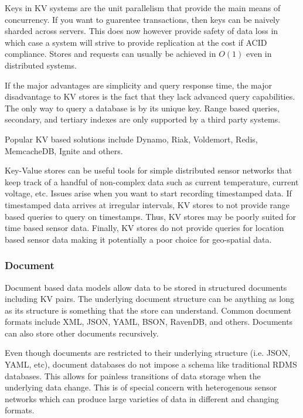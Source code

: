 \documentclass[twocolumn]{article}
\begin{document}
Keys in KV systems are the unit parallelism that provide the main means of concurrency. If you want to guarentee transactions, then keys can be naively sharded across servers. This does now however provide safety of data loss in which case a system will strive to provide replication at the cost if ACID compliance. Stores and requests can usually be achieved in $O(1)$ even in distributed systems\cite{ravendb}.

If the major advantages are simplicity and query response time\cite{chen_big_2014}, the major disadvantage to KV stores is the fact that they lack advanced query capabilities. The only way to query a database is by its unique key. Range based queries, secondary, and tertiary indexes are only supported by a third party systems.

Popular KV based solutions include Dynamo, Riak, Voldemort, Redis, MemcacheDB, Ignite  and others.

Key-Value stores can be useful tools for simple distributed sensor networks that keep track of a handful of non-complex data such as current temperature, current voltage, etc. Issues arise when you want to start recording timestamped data. If timestamped data arrives at irregular intervals, KV stores to not provide range based queries to query on timestamps. Thus, KV stores may be poorly suited for time based sensor data. Finally, KV stores do not provide queries for location based sensor data making it potentially a poor choice for geo-spatial data.

\subsubsection{Document}
Document based data models allow data to be stored in structured documents including KV pairs. The underlying document structure can be anything as long as its structure is something that the store can understand. Common document formats include XML, JSON, YAML, BSON, RavenDB, and others\cite{chen_big_2014}. Documents can also store other documents recursively.

Even though documents are restricted to their underlying structure (i.e. JSON, YAML, etc), document databases do not impose a schema like traditional RDMS databases. This allows for painless transitions of data storage when the underlying data change\cite{sharma_extended_2015}.  This is of special concern with heterogenous sensor networks which can produce large varieties of data in different and changing formats.
\end{document}
